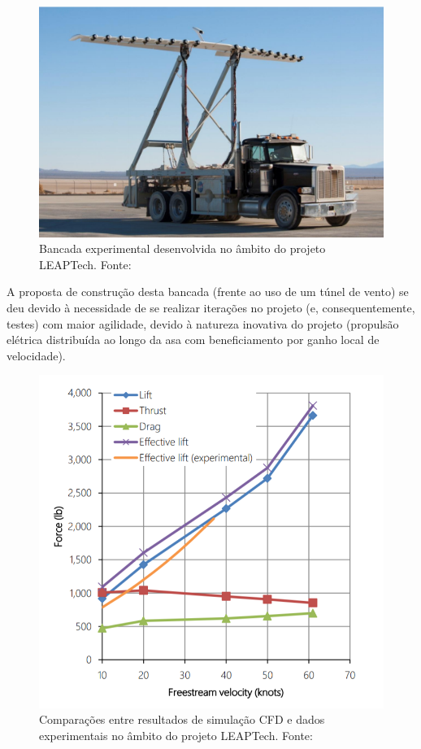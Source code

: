 \begin{figure}[!ht]
    \centering
    \includegraphics[width=.8\linewidth]{figuras/leaptech/leaptech1.png}
    \caption{Bancada experimental desenvolvida no âmbito do projeto LEAPTech. Fonte: \cite{murray2016leaptech}}
    \label{fig:leaptech1}
\end{figure}

A proposta de construção desta bancada (frente ao uso de um túnel de vento) se deu devido à necessidade de se realizar iterações no projeto (e, consequentemente, testes) com maior agilidade, devido à natureza inovativa do projeto (propulsão elétrica distribuída ao longo da asa com beneficiamento por ganho local de velocidade).

\begin{figure}[H]
    \centering
    \includegraphics[width=.8\linewidth]{figuras/leaptech/cfd_comp.png}
    \caption{Comparações entre resultados de simulação CFD e dados experimentais no âmbito do projeto LEAPTech. Fonte: \cite{stoll2015comparison}}
    \label{fig:leaptech1}
\end{figure}

